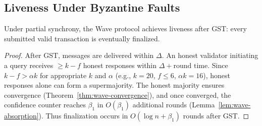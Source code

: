 \subsection{Liveness Under Byzantine Faults}

\begin{lemma}
\label{lem:wave-liveness}
Under partial synchrony, the Wave protocol achieves liveness after GST: every submitted
valid transaction is eventually finalized.
\end{lemma}

\begin{proof}
After GST, messages are delivered within $\Delta$. An honest validator initiating a query
receives $\geq k - f$ honest responses within $\Delta + \text{round time}$. Since
$k - f > \alpha k$ for appropriate $k$ and $\alpha$ (e.g., $k = 20$, $f \leq 6$, $\alpha k = 16$),
honest responses alone can form a supermajority. The honest majority ensures convergence
(Theorem~\ref{thm:wave-convergence}), and once converged, the confidence counter reaches $\beta_1$
in $O(\beta_1)$ additional rounds (Lemma~\ref{lem:wave-absorption}). Thus finalization occurs
in $O(\log n + \beta_1)$ rounds after GST.
\end{proof}

